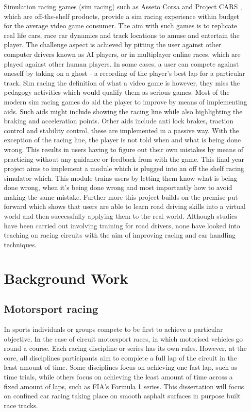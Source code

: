 Simulation racing games (sim racing) such as Asseto Corsa \cite{assestoCorsa} and Project CARS \cite{ProjectCars} , which are off-the-shelf products, provide a sim racing experience within budget for the average video game consumer. The aim with such games is to replicate real life cars, race car dynamics and track locations to amuse and entertain the player. The challenge aspect is achieved by pitting the user against other computer drivers known as AI players, or in multiplayer online races, which are played against other human players. In some cases, a user can compete against oneself by taking on a ghost - a recording of the player's best lap for a particular track. Sim racing the definition of what a video game is however, they miss the pedagogy activities which would qualify them as serious games. Most of the modern sim racing games do aid the player to improve by means of implementing aids. Such aids might include showing the racing line while also highlighting the braking and acceleration points. Other aids include anti lock brakes, traction control and stability control, these are implemented in a passive way. With the exception of the racing line, the player is not told when and what is being done wrong. This results in users having to figure out their own mistakes by means of practicing without any guidance or feedback from with the game. This final year project aims to implement a module which is plugged into an off the shelf racing simulator which. This module trains users by letting them know what is being done wrong, when it's being done wrong and most importantly how to avoid making the same mistake. Further more this project builds on the premise put forward which shows that users are able to learn road driving skills into a virtual world and then successfully applying them to the real world\cite{li2015can}\cite{vogel2006computer}. Although studies have been carried out involving training for road drivers, none have looked into teaching on racing circuits with the aim of improving racing and car handling techniques. 

\newpage
\section{Background Work}

\subsection{Motorsport racing}

In sports individuals or groups compete to be first to achieve a particular objective. In the case of circuit motorsport races, in which motorised vehicles go round a course. Each racing discipline or series has its own rules. However, at the core, all disciplines participants aim to complete a full lap of the circuit in the least amount of time. Some disciplines focus on achieving one fast lap, such as time trials, while others focus on achieving the least amount of time across a fixed amount of laps, such as FIA's Formula 1 series. This dissertation will focus on confined car racing taking place on smooth asphalt surfaces in purpose built race tracks. 

